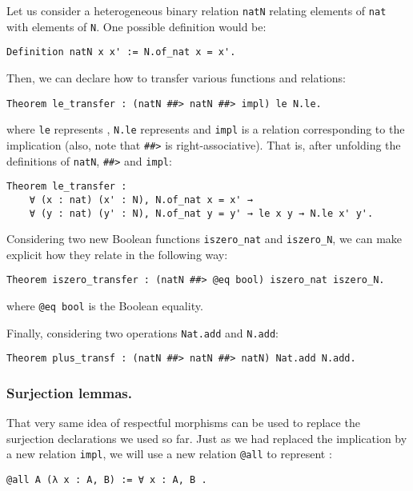 \documentclass{llncs}
\begin{document}
\begin{example}
    Let us consider a heterogeneous binary relation \verb|natN| relating
    elements of \verb|nat| with elements of \verb|N|.
    One possible definition would be:
    \begin{verbatim}Definition natN x x' := N.of_nat x = x'.\end{verbatim}
    Then, we can declare how to transfer various functions and relations:
    \begin{verbatim}Theorem le_transfer : (natN ##> natN ##> impl) le N.le.\end{verbatim}
    where \verb|le| represents ,
    \verb|N.le| represents  and \verb|impl|
    is a relation corresponding to the implication (also, note that
    \verb|##>| is right-associative).
    That is, after unfolding the definitions of
    \verb|natN|, \verb|##>| and \verb|impl|:
    \begin{verbatim}Theorem le_transfer :
    ∀ (x : nat) (x' : N), N.of_nat x = x' →
    ∀ (y : nat) (y' : N), N.of_nat y = y' → le x y → N.le x' y'.\end{verbatim}

    Considering two new Boolean functions \verb|iszero_nat| and \verb|iszero_N|,
    we can make explicit how they relate in the following way:
    \begin{verbatim}Theorem iszero_transfer : (natN ##> @eq bool) iszero_nat iszero_N.\end{verbatim}
    where \verb+@eq bool+ is the Boolean equality.

    Finally, considering two operations \verb|Nat.add| and \verb|N.add|:
    \begin{verbatim}Theorem plus_transf : (natN ##> natN ##> natN) Nat.add N.add.\end{verbatim}
\end{example}

\subsubsection{Surjection lemmas.}

That very same idea of respectful morphisms can be used to replace
the surjection declarations we used so far.
Just as we had replaced the implication  by a new relation
\texttt{impl}, we will use a new relation \texttt{@all} to represent :
\begin{verbatim}@all A (λ x : A, B) := ∀ x : A, B .\end{verbatim}
\end{document}
